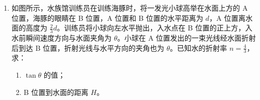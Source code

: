 \documentclass[\gkver]{gaokaozhenti}
\begin{document}
\begin{enumerate}
{	$\frac{1}{E}=\frac{4.9-2.0}{35}$

	解得 $E=12\UV$

	$\frac{R_{\mathrm{A}}+R_{0}+r}{E}=2$

	解得 $r=3.0\UO$

	再将 $\mathrm{S}_{2}$ 置于位置 2，此时电流表读数为 $0.400\UA$，则

	$E=I^{\prime}(r+R_{0}+R_{\mathrm{A}}+R_{x})$

	解得 $R_{x}=6.0\UO$

	$R_{x}=\rho\frac{L}{S}=\rho\frac{L}{\frac{1}{4}\pi D^{2}}$


	解得 $\rho=\frac{\pi D^{2}R_{x}}{4L}$

	（3）由（2）可知 $E=12\UV$，$r=3.0\UO$

	（4）根据表达式 $E=I^{\prime}(r+R_{0}+R_{\mathrm{A}}+R_{x})$

	因电源电动势变小，内阻变大，则当安培表有相同读数时，得到的 $R_{x}$ 的值偏小，即 $R_{x}$ 测量值偏小。
}

\item
如图所示，水族馆训练员在训练海豚时，将一发光小球高举在水面上方的 A 位置，海豚的眼睛在 B 位置，A 位置和 B 位置的水平距离为 $d$，A 位置离水面的高度为 $\frac{2}{3}d$。训练员将小球向左水平抛出，入水点在 B 位置的正上方，入水前瞬间速度方向与水面夹角为 $\theta$。小球在 A 位置发出的一束光线经水面折射后到达 B 位置，折射光线与水平方向的夹角也为 $\theta$。已知水的折射率 $n=\frac{4}{3}$，求：
\begin{enumerate}
	\item
	$\tan\theta$ 的值；
	\item
	B 位置到水面的距离 $H$。
\end{enumerate}

\end{enumerate}
\end{document}
